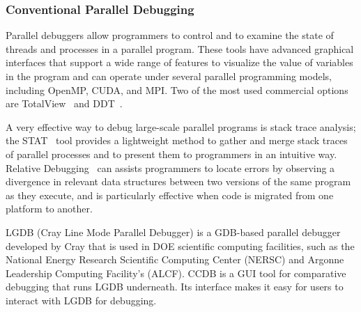\subsubsection{Conventional Parallel Debugging}
Parallel debuggers allow programmers to control and to examine the state
of threads and processes in a parallel program. These tools have advanced
graphical interfaces that support a wide range of features to visualize 
the value of variables in the program and can operate under several parallel programming
models, including OpenMP, CUDA, and MPI. Two of the most used commercial options
are TotalView~\cite{TotalView} and DDT~\cite{DDT}.

A very effective way to debug large-scale parallel programs is stack trace analysis; 
the STAT~\cite{STAT} tool provides a lightweight method to gather and merge 
stack traces of parallel processes and to present them to programmers in an 
intuitive way. Relative Debugging~\cite{DeRose:2015} can assists programmers to
locate errors by observing a divergence in relevant data structures between two
versions of the same program as they execute, and is particularly
effective when code is migrated from one platform to another.

LGDB (Cray Line Mode Parallel Debugger) is a GDB-based parallel debugger
developed by Cray that is used in DOE scientific computing facilities, such
as the National Energy Research Scientific Computing Center (NERSC) and
Argonne Leadership Computing Facility’s (ALCF).
CCDB is a GUI tool for comparative debugging that runs LGDB underneath.
Its interface makes it easy for users to interact with LGDB for debugging.





